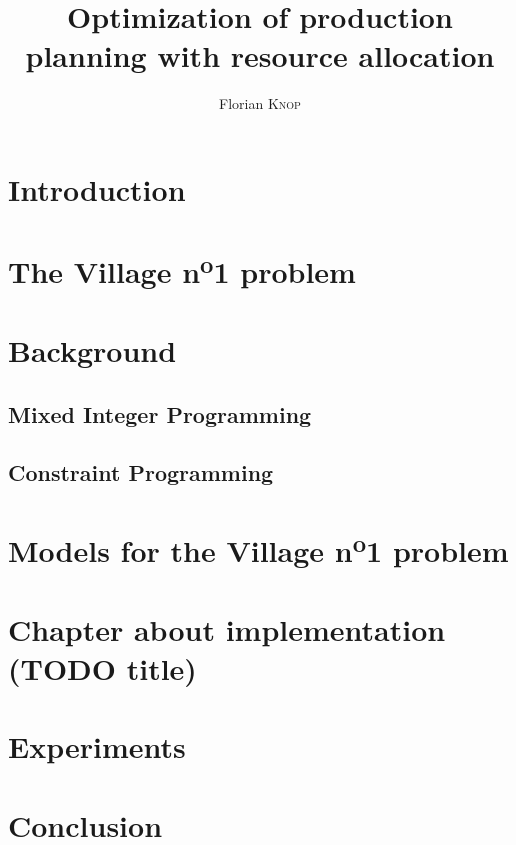 \documentclass{template/EPL-master-thesis-covers-EN}
\title{Optimization of production planning with resource allocation}
\author{Florian \textsc{Knop}}
\begin{document}
  
  \maketitle

  \tableofcontents

  \chapter{Introduction}
  

  \chapter{The Village n\textsuperscript{o}1 problem}
  


  \chapter{Background}
  \section{Mixed Integer Programming}
  \section{Constraint Programming}
  
  \chapter{Models for the Village n\textsuperscript{o}1 problem}

  
  
  

  \chapter{Chapter about implementation (TODO title)}

  \chapter{Experiments}

  \chapter{Conclusion}

  \backcoverpage
\end{document}
